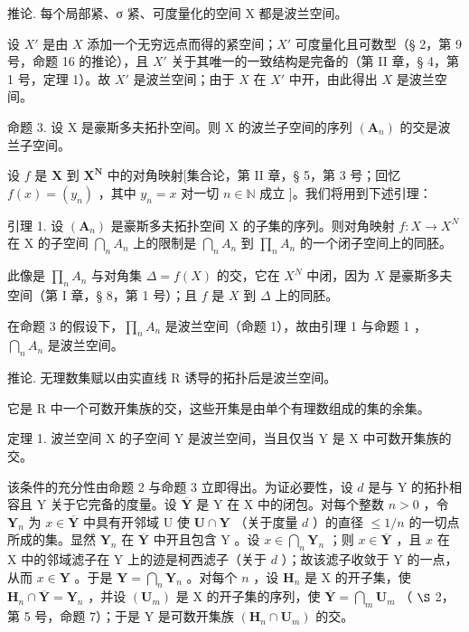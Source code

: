 推论. 每个局部紧、σ 紧、可度量化的空间 X 都是波兰空间。

设 \(X'\) 是由 \(X\) 添加一个无穷远点而得的紧空间；\(X'\) 可度量化且可数型（§ 2，第 9 号，命题 16 的推论），且 \(X'\) 关于其唯一的一致结构是完备的（第 II 章，§ 4，第 1 号，定理 1）。故 \(X'\) 是波兰空间；由于 \(X\) 在 \(X'\) 中开，由此得出 \(X\) 是波兰空间。

命题 3. 设 X 是豪斯多夫拓扑空间。则 X 的波兰子空间的序列 \((\mathbf{A}_{n})\) 的交是波兰子空间。

设 \(f\) 是 \(\mathbf{X}\) 到 \(\mathbf{X}^{\mathbf{N}}\) 中的对角映射{[}集合论，第 II 章，§ 5，第 3 号；回忆 \(f(x) = (y_n)\) ，其中 \(y_n = x\) 对一切 \(n \in \mathbb{N}\) 成立 {]}。我们将用到下述引理：

引理 1. 设 \((\mathbf{A}_{n})\) 是豪斯多夫拓扑空间 X 的子集的序列。则对角映射 \(f: X \to X^{N}\) 在 X 的子空间 \(\bigcap_{n} A_{n}\) 上的限制是 \(\bigcap_{n} A_{n}\) 到 \(\prod_{n} A_{n}\) 的一个闭子空间上的同胚。

此像是 \(\prod_{n} A_n\) 与对角集 \(\Delta = f(X)\) 的交，它在 \(X^N\) 中闭，因为 \(X\) 是豪斯多夫空间（第 I 章，§ 8，第 1 号）；且 \(f\) 是 \(X\) 到 \(\Delta\) 上的同胚。

在命题 3 的假设下，\(\prod_{n} A_{n}\) 是波兰空间（命题 1），故由引理 1 与命题 1 ，\(\bigcap_{n} A_{n}\) 是波兰空间。

推论. 无理数集赋以由实直线 R 诱导的拓扑后是波兰空间。

它是 R 中一个可数开集族的交，这些开集是由单个有理数组成的集的余集。

定理 1. 波兰空间 X 的子空间 Y 是波兰空间，当且仅当 Y 是 X 中可数开集族的交。

该条件的充分性由命题 2 与命题 3 立即得出。为证必要性，设 \(d\) 是与 Y 的拓扑相容且 Y 关于它完备的度量。设 \(\overline{\mathbf{Y}}\) 是 Y 在 X 中的闭包。对每个整数 \(n>0\) ，令 \(\mathbf{Y}_{n}\) 为 \(x\in\overline{\mathbf{Y}}\) 中具有开邻域 U 使 \(\mathbf{U}\cap\mathbf{Y}\) （关于度量 \(d\) ）的直径 \(\leqslant1/n\) 的一切点所成的集。显然 \(\mathbf{Y}_{n}\) 在 \(\overline{\mathbf{Y}}\) 中开且包含 Y 。设 \(x\in\bigcap_{n}\mathbf{Y}_{n}\) ；则 \(x\in\overline{\mathbf{Y}}\) ，且 \(x\) 在 X 中的邻域滤子在 Y 上的迹是柯西滤子（关于 \(d\) ）；故该滤子收敛于 Y 的一点，从而 \(x\in\mathbf{Y}\) 。于是 \(\mathbf{Y}=\bigcap_{n}\mathbf{Y}_{n}\) 。对每个 \(n\) ，设 \(\mathbf{H}_{n}\) 是 X 的开子集，使 \(\mathbf{H}_{n}\cap\overline{\mathbf{Y}}=\mathbf{Y}_{n}\) ，并设 \((\mathbf{U}_{m})\) 是 X 的开子集的序列，使 \(\overline{\mathbf{Y}}=\bigcap_{m}\mathbf{U}_{m}\) （ \(\S\) 2，第 5 号，命题 7）；于是 Y 是可数开集族 \((\mathbf{H}_{n}\cap\mathbf{U}_{m})\) 的交。

